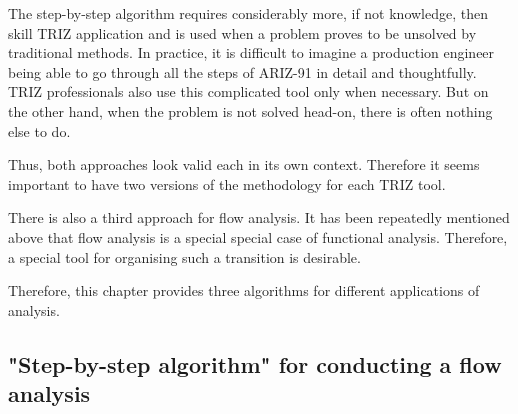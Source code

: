 \documentclass[a4paper,11pt]{article}
\begin{document}
The step-by-step algorithm requires considerably more, if not knowledge, then
skill TRIZ application and is used when a problem proves to be unsolved by
traditional methods. In practice, it is difficult to imagine a production
engineer being able to go through all the steps of ARIZ-91 in detail and
thoughtfully. TRIZ professionals also use this complicated tool only when
necessary. But on the other hand, when the problem is not solved head-on,
there is often nothing else to do.

Thus, both approaches look valid each in its own context. Therefore it seems
important to have two versions of the methodology for each TRIZ tool.

There is also a third approach for flow analysis. It has been repeatedly
mentioned above that flow analysis is a special special case of functional
analysis. Therefore, a special tool for organising such a transition is
desirable.

Therefore, this chapter provides three algorithms for different applications
of analysis.

\subsection{"Step-by-step algorithm" for conducting a flow analysis}
\end{document}
